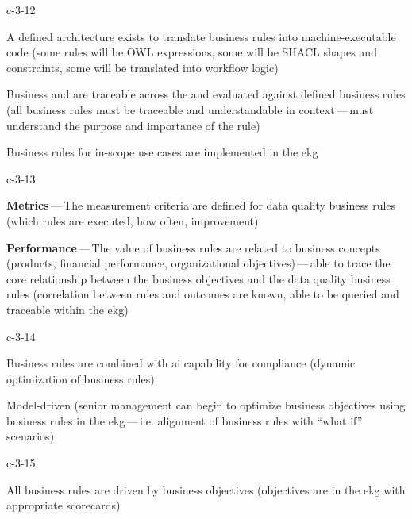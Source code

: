 \begin{level-assessment}{c-3-1}{2}

  \item A defined architecture exists to translate business rules into machine-executable code (some rules will be
        OWL expressions, some will be SHACL shapes and constraints, some will be translated into
        workflow logic)
  \item Business  and  are traceable across the  and
        evaluated against defined business rules (all business rules must be traceable and understandable in
        context\,---\,must understand the purpose and importance of the rule)
  \item Business rules for in-scope use cases are implemented in the \gls{ekg}

\end{level-assessment}

\begin{level-assessment}{c-3-1}{3}

    \item \textbf{Metrics}\,---\,The measurement criteria are defined for data quality business rules (which rules are executed,
          how often, improvement)
    \item \textbf{Performance}\,---\,The value of business rules are related to business concepts (products, financial performance,
          organizational objectives)\,---\,able to trace the core relationship between the business objectives and
          the data quality business rules (correlation between rules and outcomes are known, able to be queried and
          traceable within the \gls{ekg})

\end{level-assessment}

\begin{level-assessment}{c-3-1}{4}

    \item Business rules are combined with \gls{ai} capability for compliance (dynamic optimization of
          business rules)
    \item Model-driven (senior management can begin to optimize business objectives using business rules in
          the \gls{ekg}\,---\,i.e. alignment of business rules with “what if” scenarios)

\end{level-assessment}

\begin{level-assessment}{c-3-1}{5}

    \item All business rules are driven by business objectives (objectives are in the \gls{ekg} with appropriate scorecards)

\end{level-assessment}
